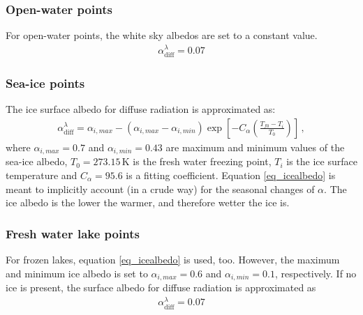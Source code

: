 \documentclass[a4paper,11pt]{article}
\begin{document}
\subsubsection{Open-water points}
For open-water points, the white sky albedos are set to a constant value.
\begin{align*}
  \alpha_{\mathrm{diff}}^{\lambda} = 0.07
\end{align*}


\subsubsection{Sea-ice points}
The ice surface albedo for diffuse radiation is approximated as:
\begin{align}
  \alpha_{\mathrm{diff}}^{\lambda} = \alpha_{i,max} - 
  \left(\alpha_{i,max}-\alpha_{i,min}\right)\exp\left[-C_{\alpha}\left(\frac{T_{f0}-T_{i}}{T_{0}}\right)\right]\,, \label{eq_icealbedo}
\end{align}
where $\alpha_{i,max}=0.7$ and $\alpha_{i,min}=0.43$ are maximum and minimum values of the sea-ice albedo, $T_{0}=273.15\,\mathrm{K}$ is the fresh water freezing point, 
$T_{i}$ is the ice surface temperature and $C_{\alpha}=95.6$ is a fitting coefficient. Equation \ref{eq_icealbedo} is meant to implicitly account (in a crude way) for the seasonal 
changes of $\alpha$. The ice albedo is the lower the warmer, and therefore wetter the ice is.


\subsubsection{Fresh water lake points}
For frozen lakes, equation \ref{eq_icealbedo} is used, too. However, the maximum and minimum ice albedo is set to $\alpha_{i,max}=0.6$ and $\alpha_{i,min}=0.1$, respectively. 
If no ice is present, the surface albedo for diffuse radiation is approximated as
\begin{align*}
   \alpha_{\mathrm{diff}}^{\lambda} = 0.07
\end{align*}
\end{document}
